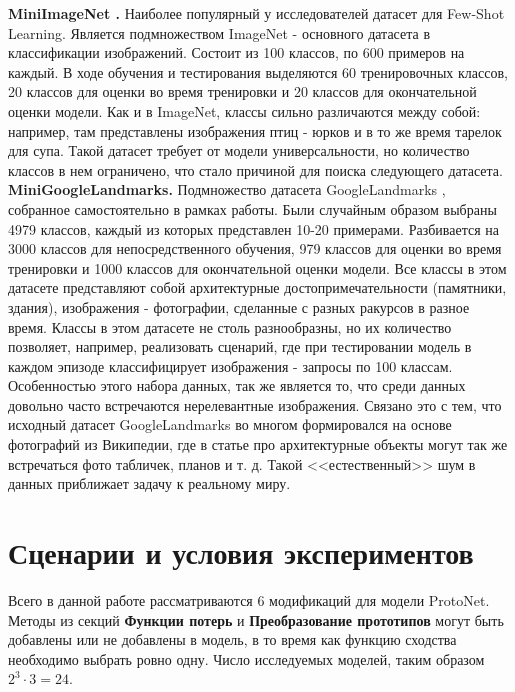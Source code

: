 \documentclass[a4paper, 12pt]{report}
\begin{document}
\textbf {MiniImageNet \cite{imagenet}.} Наиболее популярный у исследователей датасет для Few-Shot Learning. Является подмножеством ImageNet - основного датасета в классификации изображений. Состоит из 100 классов, по 600 примеров на каждый. В ходе обучения и тестирования выделяются 60 тренировочных классов, 20 классов для оценки во время тренировки и 20 классов для окончательной оценки модели. Как и в ImageNet, классы сильно различаются между собой: например, там представлены изображения птиц - юрков и в то же время тарелок для супа. Такой датасет требует от модели универсальности, но количество классов в нем ограничено, что стало причиной для поиска следующего датасета. \\

\textbf {MiniGoogleLandmarks.} Подмножество датасета GoogleLandmarks \cite{google}, собранное самостоятельно в рамках работы. Были случайным образом выбраны 4979 классов, каждый из которых представлен 10-20 примерами. Разбивается на 3000 классов для непосредственного обучения, 979 классов для оценки во время тренировки и 1000 классов для окончательной оценки модели. Все классы в этом датасете представляют собой архитектурные достопримечательности (памятники, здания), изображения - фотографии, сделанные с разных ракурсов в разное время. Классы в этом датасете не столь разнообразны, но их количество позволяет, например, реализовать сценарий, где при тестировании модель в каждом эпизоде классифицирует изображения - запросы по 100 классам. Особенностью этого набора данных, так же является то, что среди данных довольно часто встречаются нерелевантные изображения. Связано это с тем, что исходный датасет GoogleLandmarks во многом формировался на основе фотографий из Википедии, где в статье про архитектурные объекты могут так же встречаться фото табличек, планов и т. д. Такой <<естественный>> шум в данных приближает задачу к реальному миру.

\section {Сценарии и условия экспериментов}

Всего в данной работе рассматриваются 6 модификаций для модели ProtoNet. Методы из секций \textbf{Функции потерь} и \textbf{Преобразование прототипов} могут быть добавлены или не добавлены в модель, в то время как функцию сходства необходимо выбрать ровно одну. Число исследуемых моделей, таким образом $2^3 \cdot 3 = 24$.\\
\end{document}
